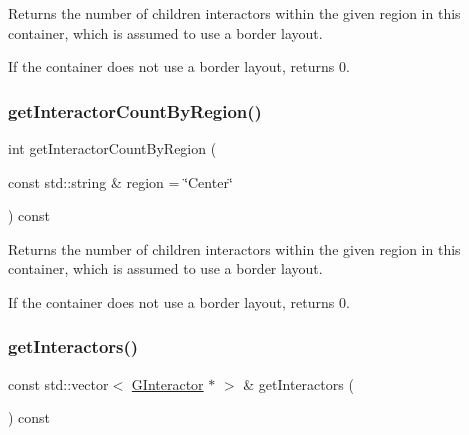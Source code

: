 Returns the number of children interactors within the given region in this container, which is assumed to use a border layout. 

If the container does not use a border layout, returns 0. \mbox{\label{classsgl_1_1GContainer_ab51dbb723159efca4fc89e2c4211610c}} 
\subsubsection{\texorpdfstring{get\+Interactor\+Count\+By\+Region()}{getInteractorCountByRegion()}\hspace{0.1cm}{\footnotesize\ttfamily [2/2]}}
{\footnotesize\ttfamily int get\+Interactor\+Count\+By\+Region (\begin{DoxyParamCaption}\item[{const std\+::string \&}]{region = {\ttfamily \char`\"{}Center\char`\"{}} }\end{DoxyParamCaption}) const\hspace{0.3cm}{\ttfamily [virtual]}}



Returns the number of children interactors within the given region in this container, which is assumed to use a border layout. 

If the container does not use a border layout, returns 0. \mbox{\label{classsgl_1_1GContainer_a04512d7151516f8a9e7298d72a290008}} 
\subsubsection{\texorpdfstring{get\+Interactors()}{getInteractors()}}
{\footnotesize\ttfamily const std\+::vector$<$ \mbox{\hyperlink{classsgl_1_1GInteractor}{G\+Interactor}} $\ast$ $>$ \& get\+Interactors (\begin{DoxyParamCaption}{ }\end{DoxyParamCaption}) const\hspace{0.3cm}{\ttfamily [virtual]}}



